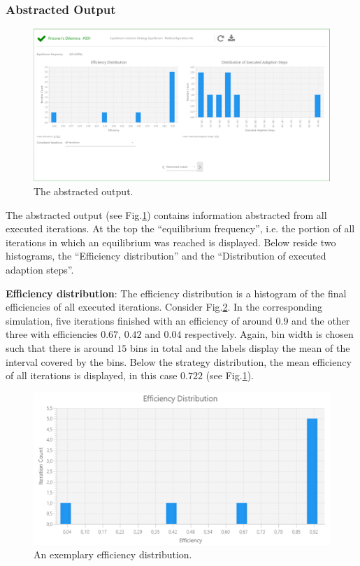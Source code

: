 \documentclass[parskip=full,11pt]{scrartcl}
\newcommand*\circled[1]{\tikz[baseline=(char.base)]{
            \node[shape=circle,draw,inner sep=2pt] (char) {#1};}}
\begin{document}
\subsubsection{Abstracted Output}
\begin{figure}
	\centering
	\includegraphics[width=\linewidth]{img_manual/abstracted_output.png}
	\caption{The abstracted output.}
	\label{fig:abstracted_output}
\end{figure}
The abstracted output (see Fig.\ref{fig:abstracted_output}) contains information abstracted from all executed iterations. At the top \circled{1} the \enquote{equilibrium frequency}, i.e. the portion of all iterations in which an equilibrium was reached is displayed. Below reside two histograms, the \enquote{Efficiency distribution} and the \enquote{Distribution of executed adaption steps}.

\textbf{Efficiency distribution}: The efficiency distribution \circled{2} is a histogram of the final efficiencies of all executed iterations. Consider Fig.\ref{fig:efficiency_distribution}. In the corresponding simulation, five iterations finished with an efficiency of around \(0.9\) and the other three with efficiencies \(0.67\), \(0.42\) and \(0.04\) respectively. Again, bin width is chosen such that there is around \(15\) bins in total and the labels display the mean of the interval covered by the bins. Below the strategy distribution, the mean efficiency of all iterations is displayed, in this case \(0.722\) (see Fig.\ref{fig:abstracted_output}).

\begin{figure}[h]
	\centering
	\includegraphics[width=0.7\linewidth]{img_manual/efficiency_distribution.png}
	\caption{An exemplary efficiency distribution.}
	\label{fig:efficiency_distribution}
\end{figure}
\end{document}
